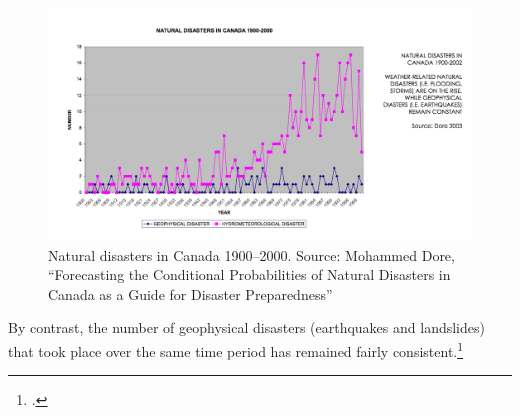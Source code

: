 \begin{figure}
\includegraphics[width=160mm]{s3-canadadisasters.png}
\centering
\caption{Natural disasters in Canada 1900--2000. Source: Mohammed Dore, ``Forecasting the Conditional Probabilities of Natural Disasters in Canada as a Guide for Disaster Preparedness''}
\label{fig:s3-canadadisasters}
\end{figure}



By contrast, the number of geophysical disasters (earthquakes and landslides) that took place over the same time period has remained fairly consistent.\footcite[][p. 8]{ScanCCToronto}



